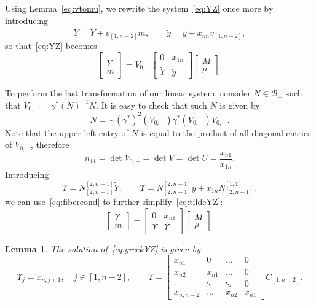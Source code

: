 \documentclass{amsart}
\newtheorem{lemma}[theorem]{Lemma}
\theoremstyle{definition}
\theoremstyle{remark}
\numberwithin{equation}{section}
\numberwithin{theorem}{section}
\def\B{{\mathcal B}}
\def\smup{{\scriptstyle\Upsilon}}
\def\wY{{\widetilde{Y}}}
\begin{document}
Using Lemma~\ref{eq:vtomu}, we rewrite the system~\eqref{eq:YZ} once more by introducing 
\begin{equation}
\label{eq:subst1}
\wY = Y + v_{[1,n-2]} m, \qquad \tilde y = y + x_{nn} v_{[1,n-2]},
\end{equation}
so that~\eqref{eq:YZ} becomes
\begin{equation}
\label{eq:tildeYZ}
\begin{bmatrix} \wY \\ m \end{bmatrix}   =  V_{0,-}   \begin{bmatrix}  0 & x_{1n}\\ \wY & \tilde y \end{bmatrix} 
\begin{bmatrix} M \\ \mu \end{bmatrix}.
\end{equation}

To perform the last transformation of our linear system, consider $N\in \B_-$ such that $V_{0,-} = \gamma^*(N)^{-1}N$. It is easy to check that such $N$ is given by
\[
N= \cdots (\gamma^*)^2(V_{0,-}) \gamma^*(V_{0,-}) V_{0,-}.
\]
Note that the upper left entry of $N$ is equal to the product of all diagonal entries of  $V_{0,-}$, therefore
\begin{equation}
\label{eq:fibercond}
n_{11}=\det V_{0,-} = \det V = \det U = \frac{x_{n1}}{x_{1n}}.
\end{equation}
Introducing
\begin{equation}
\label{eq:subst2}
\Upsilon = N_{[2,n-1]}^{[2,n-1]} \wY,\qquad \smup =  N_{[2,n-1]}^{[2,n-1]} \tilde y + x_{1n} N_{[2,n-1]}^{[1,1]}, 
\end{equation}
we can use~\eqref{eq:fibercond} to further simplify~\eqref{eq:tildeYZ}:
\begin{equation}
\label{eq:greekYZ}
\begin{bmatrix} \Upsilon \\ m \end{bmatrix}   =   \begin{bmatrix} 0 &  x_{n1} \\ \Upsilon & \smup \end{bmatrix}
\begin{bmatrix} M \\ \mu \end{bmatrix}.
\end{equation}
 
\begin{lemma}
\label{greekYZsols}
 The solution of~\eqref{eq:greekYZ} is given by
\[
\smup_j= x_{n, j+1}, \quad j\in[1, n-2],\qquad  \Upsilon = \begin{bmatrix} x_{n1}& 0&\dots & 0 \\ x_{n2} & x_{n1}  &\dots &0\\ \vdots & \ddots & \ddots &0 \\  
x_{n,n-2}  &  \dots &  x_{n2}  & x_{n1}\end{bmatrix}C_{[1,n-2]}. 
\]
\end{lemma}
\end{document}
